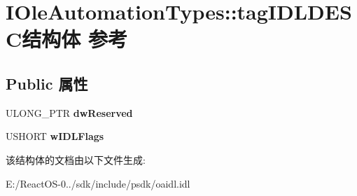 \hypertarget{struct_i_ole_automation_types_1_1tag_i_d_l_d_e_s_c}{}\section{I\+Ole\+Automation\+Types\+:\+:tag\+I\+D\+L\+D\+E\+S\+C结构体 参考}
\label{struct_i_ole_automation_types_1_1tag_i_d_l_d_e_s_c}
\subsection*{Public 属性}
\begin{DoxyCompactItemize}
\item 
\mbox{\label{struct_i_ole_automation_types_1_1tag_i_d_l_d_e_s_c_abbe33e280c1e14c2d9697c9310d1d178}} 
U\+L\+O\+N\+G\+\_\+\+P\+TR {\bfseries dw\+Reserved}
\item 
\mbox{\label{struct_i_ole_automation_types_1_1tag_i_d_l_d_e_s_c_a94019d0e24ab499cd6ba65b009bc195f}} 
U\+S\+H\+O\+RT {\bfseries w\+I\+D\+L\+Flags}
\end{DoxyCompactItemize}


该结构体的文档由以下文件生成\+:\begin{DoxyCompactItemize}
\item 
E\+:/\+React\+O\+S-\/0../sdk/include/psdk/oaidl.\+idl\end{DoxyCompactItemize}
